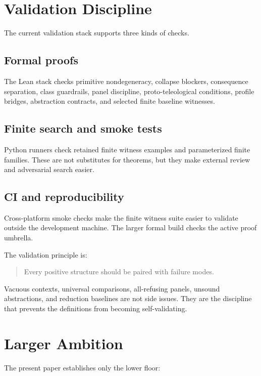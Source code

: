 \documentclass[11pt]{article}
\begin{document}
\section{Validation Discipline}

The current validation stack supports three kinds of checks.

\subsection{Formal proofs}

The Lean stack checks primitive nondegeneracy, collapse blockers, consequence
separation, class guardrails, panel discipline, proto-teleological conditions,
profile bridges, abstraction contracts, and selected finite baseline
witnesses.

\subsection{Finite search and smoke tests}

Python runners check retained finite witness examples and parameterized finite
families. These are not substitutes for theorems, but they make external
review and adversarial search easier.

\subsection{CI and reproducibility}

Cross-platform smoke checks make the finite witness suite easier to validate
outside the development machine. The larger formal build checks the active
proof umbrella.

The validation principle is:

\begin{quote}
Every positive structure should be paired with failure modes.
\end{quote}

Vacuous contexts, universal comparisons, all-refusing panels, unsound
abstractions, and reduction baselines are not side issues. They are the
discipline that prevents the definitions from becoming self-validating.

\section{Larger Ambition}

The present paper establishes only the lower floor:
\end{document}
